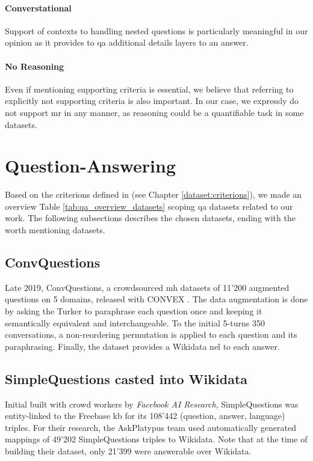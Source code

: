 \paragraph{Converstational}
Support of contexts to handling nested questions is particularly meaningful in our opinion as it provides to \gls{qa} additional details layers to an answer.

\paragraph{No Reasoning}
Even if mentioning supporting criteria is essential, we believe that referring to explicitly not supporting criteria is also important. In our case, we expressly do not support \gls{mr} in any manner, as reasoning could be a quantifiable task in some datasets.


\section{Question-Answering}
\label{dataset:qa}
Based on the criterions defined in (see Chapter \ref{dataset:criterions}), we made an overview Table \ref{tab:qa_overview_datasets} scoping \gls{qa} datasets related to our work. The following subsections describes the chosen datasets, ending with the worth mentioning datasets.

\subsection{ConvQuestions}
\label{dataset:convquestions}
Late 2019, ConvQuestions, a crowdsourced \gls{mh} datasets of 11'200 augmented questions on 5 domains, released with CONVEX \autocite{paper:convex}. The data augmentation is done by asking the Turker to paraphrase each question once and keeping it semantically equivalent and interchangeable. To the initial 5-turns 350 conversations, a non-reordering permutation is applied to each question and its paraphrasing. Finally, the dataset provides a Wikidata \gls{nel} to each answer.

\subsection{SimpleQuestions casted into Wikidata}
\label{dataset:simplequestions}
Initial built with crowd workers by \textit{Facebook AI Research}, SimpleQuestions\autocite{paper:journals/corr/BordesUCW15} was entity-linked to the Freebase \gls{kb} for its 108'442 (question, answer, language) triples. For their research, the AskPlatypus \autocite{paper:wikidata-benchmark} team used automatically generated mappings of 49'202 SimpleQuestions triples to Wikidata. Note that at the time of building their dataset, only 21'399 were answerable over Wikidata.

